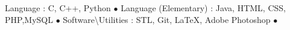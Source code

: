       
\begin{cvhonors}
  \cvhonor
    {\small Language : }
    {\small C, C++, Python}
    {}
    {$\bullet$}
  \cvhonor
    {\small Language (Elementary) : }
    {\small Java, HTML, CSS, PHP,MySQL}
    {}
    {$\bullet$}
  \cvhonor
    {\small Software\textbackslash Utilities : }
    {\small STL, Git, \LaTeX, Adobe Photoshop}
    {}
    {$\bullet$}
\end{cvhonors}